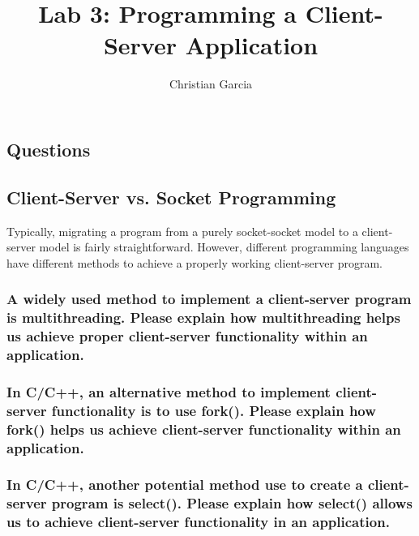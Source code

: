 \documentclass{article}
\title{Lab 3: Programming a Client-Server Application}
\author{Christian Garcia}
\begin{document}
	\maketitle
	
	
	\begin{Huge}
		\section{Questions}
	\end{Huge}
	
	\begin{Large}
		\subsection{\textbf{Client-Server vs. Socket Programming}}
	\end{Large}
	
	Typically, migrating a program from a purely socket-socket model to a client-server model is fairly straightforward. However, different programming languages have different methods to achieve a properly working client-server program. 
	\linebreak

	\subsubsection{A widely used method to implement a client-server program is multithreading. Please explain how multithreading helps us achieve proper client-server functionality within an application.}
	\pagebreak
	\subsubsection{In C/C++, an alternative method to implement client-server functionality is to use fork(). Please explain how fork() helps us achieve client-server functionality within an application.}
	\vspace{144pt}
	\subsubsection{In C/C++, another potential method use to create a client-server program is select(). Please explain how select() allows us to achieve client-server functionality in an application.}
	\pagebreak
	
\end{document}
